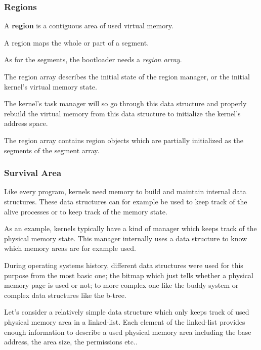 %
%

\subsubsection{Regions}

A \textbf{region} is a contiguous area of used virtual memory.

A region maps the whole or part of a segment.

As for the segments, the bootloader needs a \textit{region array}.

The region array describes the initial state of the region manager, or
the initial kernel's virtual memory state.

The kernel's task manager will so go through this data structure
and properly rebuild the virtual memory from this data structure to
initialize the kernel's address space.

The region array contains region objects which are partially initialized
as the segments of the segment array.


%
%

\subsubsection{Survival Area}

Like every program, kernels need memory to build and maintain internal
data structures. These data structures can for example be used to keep
track of the alive processes or to keep track of the memory state.

As an example, kernels typically have a kind of manager which keeps track
of the physical memory state. This manager internally uses a data
structure to know which memory areas are for example used.

During operating systems history, different data structures were used for
this purpose from the most basic one; the bitmap which just tells whether
a physical memory page is used or not; to more complex one like the buddy
system or complex data structures like the b-tree.

Let's consider a relatively simple data structure which only keeps track
of used physical memory area in a linked-list. Each element of the
linked-list provides enough information to describe a used physical memory
area including the base address, the area size, the permissions etc..

